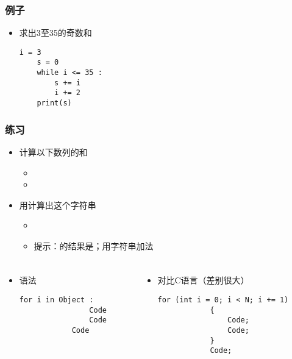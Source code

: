 \begin{frame} [fragile]
	\frametitle{例子}
	\linespread{1.25}
	\begin{itemize}
	\item 求出3至35的奇数和
	\begin{lstlisting}[style=pythonstyle, gobble=4, texcl]
	i = 3
	s = 0
	while i <= 35 :
		s += i
		i += 2
	print(s)
	\end{lstlisting}
	\end{itemize}
\end{frame}

\begin{frame} [fragile]
	\frametitle{练习}
	\linespread{1.5}
	\begin{itemize}
	\item 计算以下数列的和
		\begin{itemize}
		\item {}
		\item {}
		\end{itemize}
	\item 用计算出这个字符串
		\begin{itemize}
		\item {}
		\item 提示：的结果是；用字符串加法
		\end{itemize}
	\end{itemize}
\end{frame}

\begin{frame} [fragile]
	\frametitle{}
	\linespread{1.5}
	\begin{columns}[T]
		\begin{column}[T]{.5\textwidth}
			\begin{itemize}
			\item 语法
			\begin{lstlisting}[style=pythonstyle, gobble=12]
			for i in Object :
				Code
				Code
			Code
			\end{lstlisting}
			\end{itemize}
		\end{column}
		\begin{column}[T]{.5\textwidth}
			\begin{itemize}
			\item 对比C语言（差别很大）
			\begin{lstlisting}[style=cstyle, gobble=12]
			for (int i = 0; i < N; i += 1)
			{
				Code;
				Code;
			}
			Code;
			\end{lstlisting}
			\end{itemize}
		\end{column}
	\end{columns}
\end{frame}

